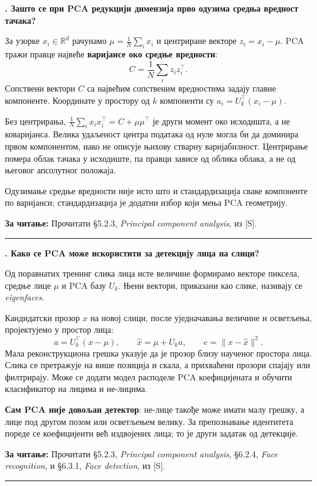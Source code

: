 \documentclass[10pt,a4paper]{article}
\newcommand{\en}[1]{\textit{#1}}
\newcounter{pitanje}
\newenvironment{odgovor}[1]{\stepcounter{pitanje}\begin{minipage}[t][0.455\textheight][t]{\textwidth}\vspace{0pt}\textbf{\thepitanje. #1}\par\smallskip}{\end{minipage}\par\ifodd\value{pitanje}\vspace{0.025\textheight}\hrule\vspace{0.015\textheight}\else\newpage\fi}
\newcommand{\izvor}[1]{\par\vfill{\footnotesize\textbf{За читање:} #1}\par}
\begin{document}
\begin{odgovor}{Зашто се при PCA редукцији димензија прво одузима средња вредност тачака?}
За узорке $x_i\in\mathbb R^d$ рачунамо $\mu=\frac1N\sum_i x_i$ и центриране векторе $z_i=x_i-\mu$. PCA тражи правце највеће \textbf{варијансе око средње вредности}:
\[
C=\frac1N\sum_i z_iz_i^\top.
\]
Сопствени вектори $C$ са највећим сопственим вредностима задају главне компоненте. Координате у простору од $k$ компоненти су $a_i=U_k^\top(x_i-\mu)$.

Без центрирања, $\frac1N\sum_i x_ix_i^\top=C+\mu\mu^\top$ је други момент око исходишта, а не коваријанса. Велика удаљеност центра података од нуле могла би да доминира првом компонентом, иако не описује њихову стварну варијабилност. Центрирање помера облак тачака у исходиште, па правци зависе од облика облака, а не од његовог апсолутног положаја.

Одузимање средње вредности није исто што и стандардизација сваке компоненте по варијанси; стандардизација је додатни избор који мења PCA геометрију.
\izvor{Прочитати §5.2.3, \en{Principal component analysis}, из [S].}
\end{odgovor}

\begin{odgovor}{Како се PCA може искористити за детекцију лица на слици?}
Од поравнатих тренинг слика лица исте величине формирамо векторе пиксела, средње лице $\mu$ и PCA базу $U_k$. Њени вектори, приказани као слике, називају се \en{eigenfaces}.

Кандидатски прозор $x$ на новој слици, после уједначавања величине и осветљења, пројектујемо у простор лица:
\[
a=U_k^\top(x-\mu),\qquad \widehat x=\mu+U_ka,\qquad
e=\|x-\widehat x\|^2.
\]
Мала реконструкциона грешка указује да је прозор близу наученог простора лица. Слика се претражује на више позиција и скала, а прихваћени прозори спајају или филтрирају. Може се додати модел расподеле PCA коефицијената и обучити класификатор на лицима и не-лицима.

\textbf{Сам PCA није довољан детектор}: не-лице такође може имати малу грешку, а лице под другом позом или осветљењем велику. За препознавање идентитета пореде се коефицијенти већ издвојених лица; то је други задатак од детекције.
\izvor{Прочитати §5.2.3, \en{Principal component analysis}, §6.2.4, \en{Face recognition}, и §6.3.1, \en{Face detection}, из [S].}
\end{odgovor}
\end{document}
